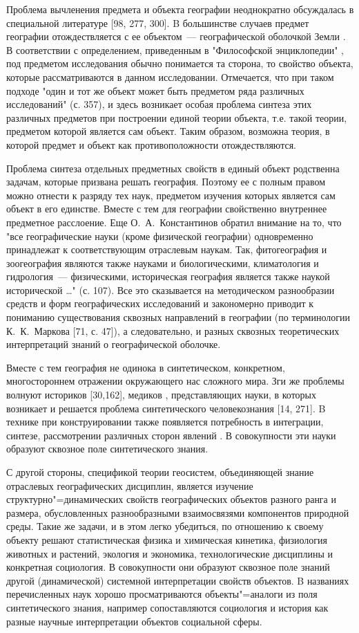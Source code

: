 \documentclass[14pt,draft,openany]{extbook}
\begin{document}
Проблема вычленения предмета и объекта географии неоднократно обсуждалась в специальной литературе [98, 277, 300]. B большинстве случаев предмет географии отождествляется с ее объектом~--- географической оболочкой Земли \cite{b284}. В соответствии с определением, приведенным в "Философской энциклопедии" \cite{b441}, под предметом исследования обычно понимается та сторона, то свойство объекта, которые рассматриваются в данном исследовании. Отмечается, что при таком подходе "один и тот же объект может быть предметом ряда различных исследований" (с. 357), и здесь возникает особая проблема синтеза этих различных предметов при построении единой теории объекта, т.е. такой теории, предметом которой является сам объект. Таким образом, возможна теория, в которой предмет и объект как противоположности отождествляются.

Проблема синтеза отдельных предметных свойств в единый объект родственна задачам, которые призвана решать география. Поэтому ее с полным правом можно отнести к разряду тех наук, предметом изучения которых является сам объект в его единстве. Вместе с тем для географии свойственно внутреннее предметное расслоение.  Еще О.~А.~Константинов \cite{b207} обратил внимание на то, что "все географические науки (кроме физической географии) одновременно принадлежат к соответствующим отраслевым наукам. Так, фитогеография и зоогеография являются также науками и биологическими, климатология и гидрология~--- физическими, историческая география является также наукой исторической \ldots{}" (с. 107). Все это сказывается на методическом разнообразии средств и форм географических исследований и закономерно приводит к пониманию существования сквозных направлений в географии (по терминологии К.~К.~Маркова [71, с. 47]), а следовательно, и разных сквозных теоретических интерпретаций знаний о географической оболочке.

Вместе с тем география не одинока в синтетическом, конкретном, многостороннем отражении окружающего нас сложного мира.  Зги же проблемы волнуют историков [30,162], медиков \cite{b464}, представляющих науки, в которых возникает и решается проблема синтетического человекознания [14, 271]. B технике при конструировании также появляется потребность в интеграции, синтезе, рассмотрении различных сторон явлений \cite{b326}. В совокупности эти науки образуют сквозное поле синтетического знания.

С другой стороны, спецификой теории геосистем, объединяющей знание отраслевых географических дисциплин, является изучение структурно"=динамических свойств географических объектов разного ранга и размера, обусловленных разнообразными взаимосвязями компонентов природной среды. Такие же задачи, и в этом легко убедиться, по отношению к своему объекту решают статистическая физика и химическая кинетика, физиология животных и растений, экология и экономика, технологические дисциплины и конкретная социология. В совокупности они образуют сквозное поле знаний другой (динамической) системной интерпретации свойств объектов. B названиях перечисленных наук хорошо просматриваются объекты"=аналоги из поля синтетического знания, например сопоставляются социология и история как разные научные интерпретации объектов социальной сферы.
\end{document}
